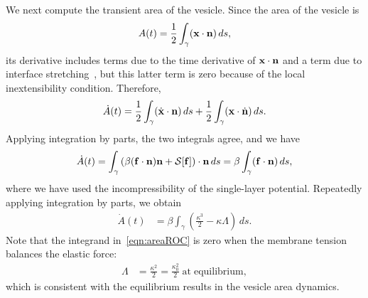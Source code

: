 \documentclass[prb,preprint,showpacs,preprintnumbers,amsmath,amssymb,longbibliography]{revtex4-1}
\begin{document}
We next compute the transient area of the vesicle. Since the area of the
vesicle is
\begin{align}
  A(t) = \frac{1}{2}\int_{\gamma} (\mathbf{x} \cdot \mathbf{n})\, ds,
  \label{eqn:area}
\end{align}
its derivative includes terms due to the time derivative of $\mathbf{x} \cdot
\mathbf{n}$ and a term due to interface stretching~\cite{lai-tse-hua2008}, but
this latter term is zero because of the local inextensibility condition.
Therefore,
\begin{align}
  \dot{A}(t) =
  \frac{1}{2} \int_{\gamma} (\dot{\mathbf{x}} \cdot \mathbf{n})\, ds  + 
  \frac{1}{2} \int_{\gamma} (\mathbf{x} \cdot \dot{\mathbf{n}})\, ds.
\end{align}
Applying integration by parts, the two integrals agree, and we have
\begin{align}
  \dot{A}(t) = \int_\gamma \left(\beta (\mathbf{f} \cdot \mathbf{n})\mathbf{n} 
    + \mathcal{S}[\mathbf{f}]\right) \cdot \mathbf{n}\, ds 
  = \beta \int_\gamma (\mathbf{f} \cdot \mathbf{n})\, ds,
\end{align}
where we have used the incompressibility of the single-layer potential.
Repeatedly applying integration by parts, we obtain
\begin{align}
  \dot{A}(t) & = \beta \int_\gamma \left(
    \frac{\kappa^3}{2} - \kappa \Lambda \right) \, ds.
  \label{eqn:areaROC}
\end{align}
Note that the integrand in~\eqref{eqn:areaROC} is zero when the membrane tension balances the elastic force:
\begin{align}
\label{eqn:areaROC2}
\Lambda &= \frac{\kappa^2}{2}=\frac{\kappa_0^2}{2} \;\mathrm{ at }\; \mathrm{equilibrium},
\end{align}
which is consistent with the equilibrium results in the vesicle area dynamics.
\end{document}
